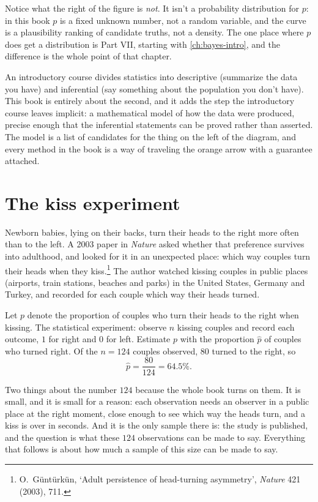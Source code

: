 Notice what the right of the figure is \textit{not}.
It isn't a probability distribution for $p$: in this book $p$ is a fixed unknown number, not a random variable, and the curve is a plausibility ranking of candidate truths, not a density.
The one place where $p$ does get a distribution is Part VII, starting with \cref{ch:bayes-intro}, and the difference is the whole point of that chapter.

\begin{bridge}
An introductory course divides statistics into descriptive (summarize the data you have) and inferential (say something about the population you don't have).
This book is entirely about the second, and it adds the step the introductory course leaves implicit: a mathematical model of how the data were produced, precise enough that the inferential statements can be proved rather than asserted.
The model is a list of candidates for the thing on the left of the diagram, and every method in the book is a way of traveling the orange arrow with a guarantee attached.
\end{bridge}

\section{The kiss experiment}
\label{sec:kiss-test}

Newborn babies, lying on their backs, turn their heads to the right more often than to the left.
A 2003 paper in \textit{Nature} asked whether that preference survives into adulthood, and looked for it in an unexpected place: which way couples turn their heads when they kiss.\footnote{O.~G\"unt\"urk\"un, `Adult persistence of head-turning asymmetry', \textit{Nature} 421 (2003), 711.}
The author watched kissing couples in public places (airports, train stations, beaches and parks) in the United States, Germany and Turkey, and recorded for each couple which way their heads turned.

Let $p$ denote the proportion of couples who turn their heads to the right when kissing.
The statistical experiment: observe $n$ kissing couples and record each outcome, $1$ for right and $0$ for left.
Estimate $p$ with the proportion $\hat{p}$ of couples who turned right.
Of the $n = 124$ couples observed, $80$ turned to the right, so
\[
\hat{p} = \frac{80}{124} = 64.5\%.
\]

Two things about the number $124$ because the whole book turns on them.
It is small, and it is small for a reason: each observation needs an observer in a public place at the right moment, close enough to see which way the heads turn, and a kiss is over in seconds.
And it is the only sample there is: the study is published, and the question is what these $124$ observations can be made to say.
Everything that follows is about how much a sample of this size can be made to say.

